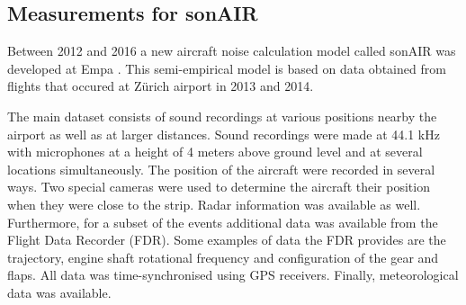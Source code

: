 %
%
%
%
%
%
%
%


\subsection{Measurements for sonAIR}\label{sec:introduction:sonair}
Between 2012 and 2016 a new aircraft noise calculation model called sonAIR was
developed at Empa \cite{Zellmann2013,Zellmann2016}. This semi-empirical model is
based on data obtained from flights that occured at Z\"{u}rich airport in 2013 and
2014.

The main dataset consists of sound recordings at various positions nearby the
airport as well as at larger distances. Sound recordings were made at 44.1 kHz with
microphones at a height of 4 meters above ground level and at several locations
simultaneously. The position of the aircraft were recorded in several ways. Two
special cameras were used to determine the aircraft their position when they
were close to the strip. Radar information was available as well. Furthermore,
for a subset of the events additional data was available from the Flight Data
Recorder (FDR). Some examples of data the FDR provides are the trajectory,
engine shaft rotational frequency and configuration of the gear and flaps. All
data was time-synchronised using GPS receivers. Finally, meteorological data was
available.



